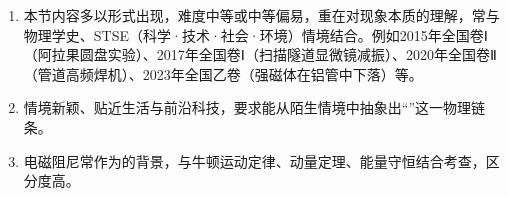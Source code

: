 \noindent{}
\begin{enumerate}[label=（\arabic*）,leftmargin=2.6em]
  \item 本节内容多以形式出现，难度中等或中等偏易，重在对现象本质的理解，常与物理学史、STSE（科学·技术·社会·环境）情境结合。例如2015年全国卷Ⅰ（阿拉果圆盘实验）、2017年全国卷Ⅰ（扫描隧道显微镜减振）、2020年全国卷Ⅱ（管道高频焊机）、2023年全国乙卷（强磁体在铝管中下落）等。
  \item 情境新颖、贴近生活与前沿科技，要求能从陌生情境中抽象出“”这一物理链条。
  \item 电磁阻尼常作为的背景，与牛顿运动定律、动量定理、能量守恒结合考查，区分度高。
\end{enumerate}

\medskip
\noindent{}
